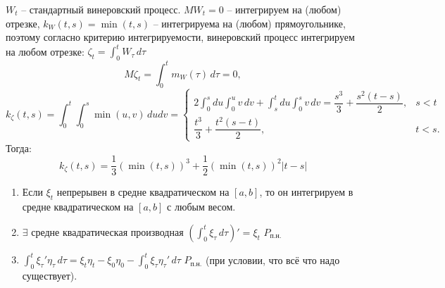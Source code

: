 \begin{ex}
  $W_t$ -- стандартный винеровский процесс. $MW_t = 0$ -- интегрируем на (любом) отрезке, 
  $k_W(t, s) = \min(t, s)$ -- интегрируема на (любом) прямоугольнике, поэтому согласно критерию
  интегрируемости, винеровский процесс интегрируем на любом отрезке:
  $\zeta_t = \int_0^t W_\tau \, d\tau$ \[
    M\zeta_t = \int_0^t m_W(\tau) \, d\tau = 0,
  \]
  \[
    k_\zeta(t, s) = \int_0^t \int_0^s \min(u, v) \, du dv
    = \begin{cases}
      2 \int_0^s du \int_0^u v \, dv + \int_s^t du \int_0^s v \, dv
      = \dfrac{s^3}{3} + \dfrac{s^2 (t-s)}{2}, &s < t \\
      \dfrac{t^3}{3} + \dfrac{t^2 (s-t)}{2}, &t < s.
    \end{cases}
  \]
  Тогда:
  \[
    k_\zeta(t, s) = \dfrac{1}{3} \left( \min(t, s) \right)^3 + \dfrac{1}{2} \left(\min(t, s)\right)^2 |t-s|
  \]
\end{ex}

\begin{remark}
  \begin{enumerate}
    \item Если $\xi_t$ непрерывен в средне квадратическом на $[a, b]$, 
      то он интегрируем в средне квадратическом на $[a, b]$ с любым весом.
    \item $\exists$ средне квадратическая производная $ \left( \int_0^t \xi_\tau \, d\tau \right)' = \xi_t $ $P_{п.н.}$
    \item $\int_0^t \xi_\tau' \eta_\tau \, d\tau = \xi_t \eta_t - \xi_0 \eta_0 - \int_0^t \xi_\tau \eta_\tau' \, d\tau$ $P_{п.н.}$ (при условии, что всё что надо существует).
  \end{enumerate}
\end{remark}

